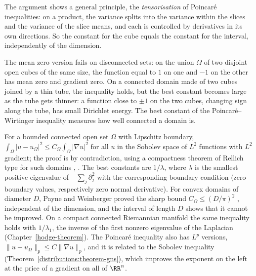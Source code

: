 The argument shows a general principle, the \emph{tensorisation} of Poincar\'e inequalities: on a product, the variance splits into the variance within the slices and the variance of the slice
means, and each is controlled by derivatives in its own directions. So the constant for the cube equals the constant for the interval, independently of the dimension.

\begin{counterexample}\label{distributions:counterexample-poincare-disconnected}
The mean zero version fails on disconnected sets: on the union $\Omega$ of two disjoint open cubes of the same size, the function equal to $1$ on one and $-1$ on the other has mean zero and gradient
zero. On a connected domain made of two cubes joined by a thin tube, the inequality holds, but the best constant becomes large as the tube gets thinner: a function close to $\pm1$ on the two
cubes, changing sign along the tube, has small Dirichlet energy. The best constant of the Poincar\'e--Wirtinger inequality measures how well connected a domain is.
\end{counterexample}

\begin{remark}\label{distributions:remark-poincare-general}
For a bounded connected open set $\Omega$ with Lipschitz boundary, $\int_\Omega|u - u_\Omega|^2 \leq C_\Omega\int_\Omega|\nabla u|^2$ for all $u$ in the Sobolev space of $L^2$ functions with $L^2$
gradient; the proof is by contradiction, using a compactness theorem of Rellich type for such domains \cite[Chapter 9]{brezis-functional}, \cite{evans-gariepy}. The best constants are $1/\lambda$,
where $\lambda$ is the smallest positive eigenvalue of $-\sum_j\partial_j^2$ with the corresponding boundary condition (zero boundary values, respectively zero normal derivative). For convex domains of
diameter $D$, Payne and Weinberger proved the sharp bound $C_\Omega \leq (D/\pi)^2$ \cite{payne-weinberger-1960}, independent of the dimension, and the interval of length $D$ shows that it cannot be
improved. On a compact connected Riemannian manifold the same inequality holds with $1/\lambda_1$, the inverse of the first nonzero eigenvalue of the Laplacian (Chapter~\ref{hodge-theorem}). The
Poincar\'e inequality also has $L^p$ versions, $\|u - u_\Omega\|_p \leq C\|\nabla u\|_p$, and it is related to the Sobolev inequality (Theorem~\ref{distributions:theorem-gns}), which improves the
exponent on the left at the price of a gradient on all of $\RR^n$.
\end{remark}

